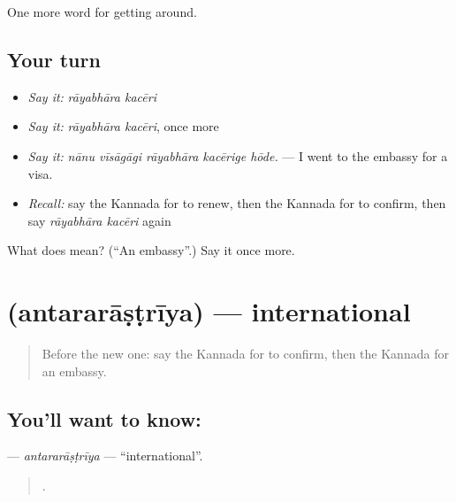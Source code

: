\begin{grammarlens}[title={What you've built}]
One more word for getting around.
\end{grammarlens}

\subsection*{Your turn}
\begin{itemize}
\raggedright
  \item \emph{Say it:} \emph{rāyabhāra kacēri}
  \item \emph{Say it:} \emph{rāyabhāra kacēri}, once more
  \item \emph{Say it:} \emph{nānu vīsāgāgi rāyabhāra kacērige hōde.} — I went to the embassy for a visa.
  \item \emph{Recall:} say the Kannada for to renew, then the Kannada for to confirm, then say \emph{rāyabhāra kacēri} again
\end{itemize}

\begin{tcolorbox}[breakable,colback=teal!4,colframe=teal!35!black,title={Before you move on}]
What does   mean? (\textquotedblleft{}An embassy\textquotedblright{}.) Say it once more.
\end{tcolorbox}
\section[\texorpdfstring{\kn{ಅಂತರರಾಷ್ಟ್ರೀಯ} (antararāṣṭrīya)}{ಅಂತರರಾಷ್ಟ್ರೀಯ (antararāṣṭrīya)}]{ (antararāṣṭrīya) — international}

\label{lesson:KA-C440-antararastriya}



\begin{quote}
Before the new one: say the Kannada for to confirm, then the Kannada for an embassy.
\end{quote}

\subsection*{You'll want to know: }
\textbf{} — \emph{antararāṣṭrīya} — \textquotedblleft{}international\textquotedblright{}.

\begin{quote}
      .
\end{quote}

